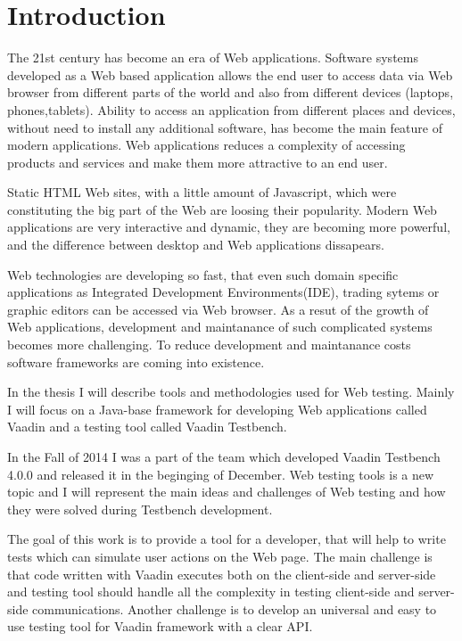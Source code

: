 	
	 \chapter{Introduction}
	 \label{ch:intro} 		
	The 21st century has become an era of Web applications. Software systems
	developed as a Web based application allows the end user to access data via
	Web browser from different parts of the world and also from different devices
	(laptops, phones,tablets). Ability to access an application from different places and
	devices, without need to install any additional software,
	has become the main feature of modern applications. Web applications reduces a
	complexity of accessing products and services and make them more attractive to an end
	user.
	
	Static HTML Web sites, with a little amount of Javascript, which
	were constituting the big part of the Web are loosing their popularity.
	Modern Web	applications are very interactive and dynamic, they are becoming
	more powerful, and the difference between desktop and Web applications
	dissapears. 
	
	Web technologies are developing so fast, that even such domain
	specific applications as Integrated Development Environments(IDE), trading
	sytems or graphic editors can be accessed via Web browser. As a resut of the
	growth of Web applications, development and maintanance of such complicated
	systems becomes more challenging. To reduce development and maintanance costs
	software frameworks are coming into existence.
	
	In the thesis I will describe tools and methodologies used for Web testing.
	Mainly I will focus on a Java-base framework for developing Web applications called Vaadin and a testing tool
	called Vaadin Testbench.
	
	 In the Fall of 2014 I was a part of the team which developed Vaadin Testbench
	 4.0.0 and released it in the beginging of December. Web testing tools is a
	 new topic and I will represent the main ideas and challenges
	 of Web testing and how they were solved during Testbench development.
	 
	 The goal of this work is to provide a tool for a developer, that will help to
	 write tests which can simulate user actions on the Web page. The main
	 challenge is that code written with Vaadin executes both on the
	 client-side and server-side and testing tool should handle all the complexity
	 in testing client-side and server-side communications. Another challenge is to
	 develop an universal and easy to use testing tool for Vaadin framework with a
	 clear API.
	 
